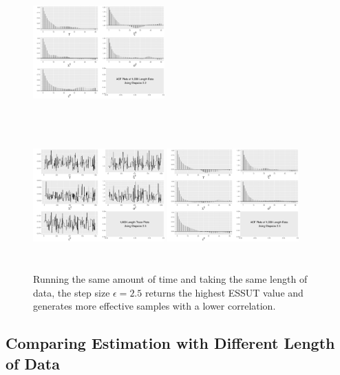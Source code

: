 \begin{figure}[h]
\includegraphics[width=0.45\textwidth,height=5cm]{Chapters/05MCMCOU/plots/gg1k22acf.pdf}
\end{figure}
\begin{figure}[h]\ContinuedFloat
\centering
\includegraphics[width=0.45\textwidth,height=5cm]{Chapters/05MCMCOU/plots/gg1k25chain.pdf}
\includegraphics[width=0.45\textwidth,height=5cm]{Chapters/05MCMCOU/plots/gg1k25acf.pdf}
\caption{Running the same amount of time and taking the same length of data, the step size $\epsilon=2.5$ returns the highest ESSUT value and generates more effective samples with a lower correlation. }\label{1koutof8kfigures}
\end{figure}



\clearpage

\subsection*{Comparing Estimation with Different Length of Data }


